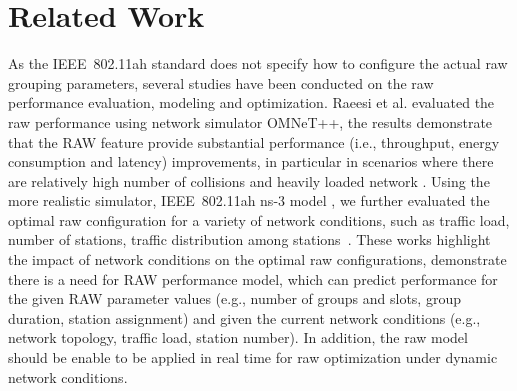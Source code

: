 \section{Related Work \label{sec:related_work}}


As the IEEE~802.11ah standard does not specify how to configure the actual \gls{raw} grouping parameters, several studies have been conducted on the \gls{raw} performance evaluation, modeling and optimization. Raeesi et al. evaluated the \gls{raw} performance using network simulator OMNeT++, the results demonstrate that the RAW feature provide
substantial performance (i.e., throughput, energy consumption and latency) improvements, in particular in scenarios where there are relatively high number of collisions and heavily loaded network \cite{Raeesi2014a}. Using the more realistic simulator, IEEE~802.11ah ns-3 model \cite{WNS32016}, we further evaluated the optimal \gls{raw}  configuration for a variety of network conditions, such as traffic load, number of stations, traffic distribution among stations~\cite{WoWMoM2016}. These works highlight the impact of network conditions on the optimal \gls{raw} configurations, demonstrate there is a need for \gls{RAW} performance model, which can predict performance for the given RAW parameter values (e.g., number of groups and slots, group duration, station assignment) and given the current network conditions (e.g., network topology, traffic load, station number). In addition, the \gls{raw} model should be enable to be applied in real time for \gls{raw} optimization under dynamic network conditions.




